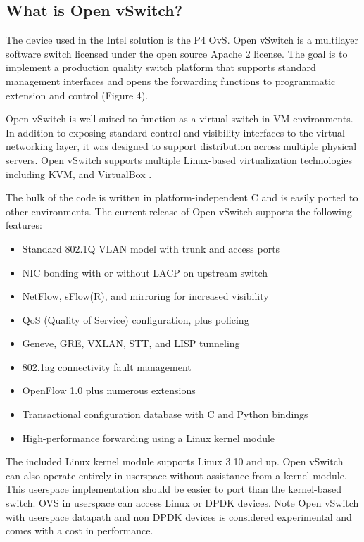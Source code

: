 \documentclass[../sn.tex]{subfiles}
\begin{document}
\subsection{What is Open vSwitch?}
The device used in the Intel solution is the P4 OvS.
Open vSwitch is a multilayer software switch licensed under the open source Apache 2 license. 
The goal is to implement a production quality switch platform that supports standard management interfaces and opens the forwarding functions to programmatic extension and control (Figure 4).

Open vSwitch is well suited to function as a virtual switch in VM environments. 
In addition to exposing standard control and visibility interfaces to the virtual networking layer, it was designed to support distribution across multiple physical servers. 
Open vSwitch supports multiple Linux-based virtualization technologies including KVM, and VirtualBox \cite{ovs}.

The bulk of the code is written in platform-independent C and is easily ported to other environments. The current release of Open vSwitch supports the following features:
\begin{itemize}
    \item Standard 802.1Q VLAN model with trunk and access ports
    \item NIC bonding with or without LACP on upstream switch
    \item NetFlow, sFlow(R), and mirroring for increased visibility
    \item QoS (Quality of Service) configuration, plus policing
    \item Geneve, GRE, VXLAN, STT, and LISP tunneling
    \item 802.1ag connectivity fault management
    \item OpenFlow 1.0 plus numerous extensions
    \item Transactional configuration database with C and Python bindings
    \item High-performance forwarding using a Linux kernel module
\end{itemize} The included Linux kernel module supports Linux 3.10 and up.
Open vSwitch can also operate entirely in userspace without assistance from a kernel module. 
This userspace implementation should be easier to port than the kernel-based switch.
OVS in userspace can access Linux or DPDK devices. Note Open vSwitch with userspace datapath and non DPDK devices is considered experimental and comes with a cost in performance.
\end{document}
